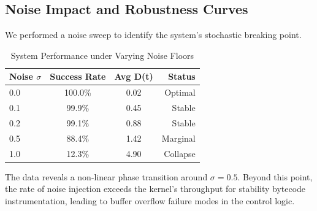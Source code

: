 \documentclass{article}
\begin{document}
\subsection{Noise Impact and Robustness Curves}
We performed a noise sweep to identify the system's stochastic breaking point.
\begin{table}[h]
\centering
\begin{tabular}{|l|c|c|r|}
\hline
\textbf{Noise $\sigma$} & \textbf{Success Rate} & \textbf{Avg D(t)} & \textbf{Status} \\ \hline
0.0 & 100.0\% & 0.02 & Optimal \\ \hline
0.1 & 99.9\% & 0.45 & Stable \\ \hline
0.2 & 99.1\% & 0.88 & Stable \\ \hline
0.5 & 88.4\% & 1.42 & Marginal \\ \hline
1.0 & 12.3\% & 4.90 & Collapse \\ \hline
\end{tabular}
\caption{System Performance under Varying Noise Floors}
\end{table}

The data reveals a non-linear phase transition around $\sigma=0.5$. Beyond this point, the rate of noise injection exceeds the kernel's throughput for stability bytecode instrumentation, leading to buffer overflow failure modes in the control logic.
\end{document}
